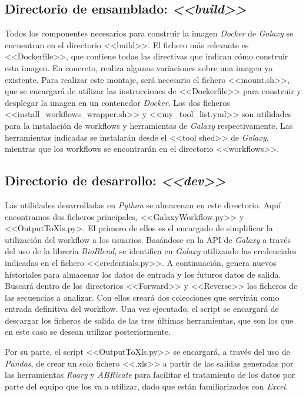 \subsection{Directorio de ensamblado: \textit{<<build>>}}
Todos los componentes necesarios para construir la imagen \textit{Docker} de \textit{Galaxy} se encuentran en el directorio <<build>>. El fichero más relevante es <<Dockerfile>>, que contiene todas las directivas que indican cómo construir esta imagen. En concreto, realiza algunas variaciones sobre una imagen ya existente. Para realizar este montaje, será necesario el fichero <<mount.sh>>, que se encargará de utilizar las instrucciones de <<Dockerfile>> para construir y desplegar la imagen en un contenedor \textit{Docker}. Los dos ficheros <<install\_workflows\_wrapper.sh>> y <<my\_tool\_list.yml>> son utilidades para la instalación de workflows y herramientas de \textit{Galaxy} respectivamente. Las herramientas indicadas se instalarán desde el <<tool shed>> de \textit{Galaxy}, mientras que los workflows se encontrarán en el directorio <<workflows>>.

\subsection{Directorio de desarrollo: \textit{<<dev>>}}
Las utilidades desarrolladas en \textit{Python} se almacenan en este directorio. Aquí encontramos dos ficheros principales, <<GalaxyWorkflow.py>> y <<OutputToXls.py>. El primero de ellos es el encargado de simplificar la utilización del workflow a los usuarios. Basándose en la API de \textit{Galaxy} a través del uso de la librería \textit{BioBlend}, se identifica en \textit{Galaxy} utilizando las credenciales indicadas en el fichero <<credentials.py>>. A continuación, genera nuevos historiales para almacenar los datos de entrada y los futuros datos de salida. Buscará dentro de los directorios <<Forward>> y <<Reverse>> los ficheros de las secuencias a analizar. Con ellos creará dos colecciones que servirán como entrada definitiva del workflow. Una vez ejecutado, el script se encargará de descargar los ficheros de salida de las tres últimas herramientas, que son los que en este caso se desean utilizar posteriormente.

Por su parte, el script <<OutputToXls.py>> se encargará, a través del uso de \textit{Pandas}, de crear un solo fichero <<.xls>> a partir de las salidas generadas por las herramientas \textit{Roary} y \textit{ABRicate} para facilitar el tratamiento de los datos por parte del equipo que los va a utilizar, dado que están familiarizados con \textit{Excel}.

